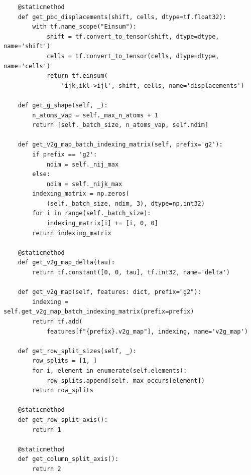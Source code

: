 \documentclass[preprint]{revtex4-2}
\begin{document}
\begin{verbatim}
    @staticmethod
    def get_pbc_displacements(shift, cells, dtype=tf.float32):
        with tf.name_scope("Einsum"):
            shift = tf.convert_to_tensor(shift, dtype=dtype, name='shift')
            cells = tf.convert_to_tensor(cells, dtype=dtype, name='cells')
            return tf.einsum(
                'ijk,ikl->ijl', shift, cells, name='displacements')

    def get_g_shape(self, _):
        n_atoms_vap = self._max_n_atoms + 1
        return [self._batch_size, n_atoms_vap, self.ndim]

    def get_v2g_map_batch_indexing_matrix(self, prefix='g2'):
        if prefix == 'g2':
            ndim = self._nij_max
        else:
            ndim = self._nijk_max
        indexing_matrix = np.zeros(
            (self._batch_size, ndim, 3), dtype=np.int32)
        for i in range(self._batch_size):
            indexing_matrix[i] += [i, 0, 0]
        return indexing_matrix

    @staticmethod
    def get_v2g_map_delta(tau):
        return tf.constant([0, 0, tau], tf.int32, name='delta')

    def get_v2g_map(self, features: dict, prefix="g2"):
        indexing = self.get_v2g_map_batch_indexing_matrix(prefix=prefix)
        return tf.add(
            features[f"{prefix}.v2g_map"], indexing, name='v2g_map')

    def get_row_split_sizes(self, _):
        row_splits = [1, ]
        for i, element in enumerate(self.elements):
            row_splits.append(self._max_occurs[element])
        return row_splits

    @staticmethod
    def get_row_split_axis():
        return 1

    @staticmethod
    def get_column_split_axis():
        return 2
\end{verbatim}
\end{document}
